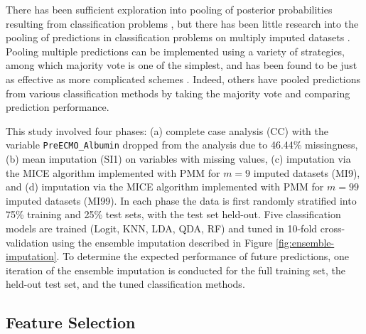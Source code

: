 \documentclass[12pt,]{article}
\begin{document}
There has been sufficient exploration into pooling of posterior
probabilities resulting from classification problems
\autocite{kittler_combining_1996}\autocite{james_majority_1998}, but
there has been little research into the pooling of predictions in
classification problems on multiply imputed datasets
\autocite{belanche_handling_2014}. Pooling multiple predictions can be
implemented using a variety of strategies, among which majority vote is
one of the simplest, and has been found to be just as effective as more
complicated schemes \autocite{lam_optimal_1995}. Indeed, others have
pooled predictions from various classification methods by taking the
majority vote
\autocite{james_majority_1998}\autocite{belanche_handling_2014} and
comparing prediction performance.

This study involved four phases: (a) complete case analysis (CC) with
the variable \texttt{PreECMO\_Albumin} dropped from the analysis due to
46.44\% missingness, (b) mean imputation (SI1) on variables with missing
values, (c) imputation via the MICE algorithm implemented with PMM for
\(m=9\) imputed datasets (MI9), and (d) imputation via the MICE
algorithm implemented with PMM for \(m=99\) imputed datasets (MI99). In
each phase the data is first randomly stratified into 75\% training and
25\% test sets, with the test set held-out. Five classification models
are trained (Logit, KNN, LDA, QDA, RF) and tuned in 10-fold
cross-validation using the ensemble imputation described in Figure
\ref{fig:ensemble-imputation}. To determine the expected performance of
future predictions, one iteration of the ensemble imputation is
conducted for the full training set, the held-out test set, and the
tuned classification methods.

\subsection{Feature Selection}\label{feature-selection}
\end{document}
